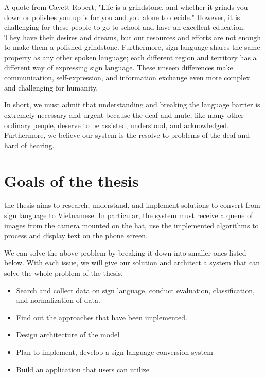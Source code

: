 A quote from Cavett Robert, "Life is a grindstone, and whether it grinds you down or polishes you up is for you and you alone to decide." However, it is challenging for these people to go to school and have an excellent education. They have their desires and dreams, but our resources and efforts are not enough to make them a polished grindstone. Furthermore, sign language shares the same property as any other spoken language; each different region and territory has a different way of expressing sign language. These unseen differences make communication, self-expression, and information exchange even more complex and challenging for humanity.

In short, we must admit that understanding and breaking the language barrier is extremely necessary and urgent because the deaf and mute, like many other ordinary people, deserve to be assisted, understood, and acknowledged. Furthermore, we believe our system is the resolve to problems of the deaf and hard of hearing.

\section{Goals of the thesis}

% 

the thesis aims to research, understand, and implement solutions to convert from sign language to Vietnamese. In particular, the system must receive a queue of images from the camera mounted on the hat, use the implemented algorithms to process and display text on the phone screen.

We can solve the above problem by breaking it down into smaller ones listed below. With each issue, we will give our solution and architect a system that can solve the whole problem of the thesis.
 
\begin{itemize}
	\item Search and collect data on sign language, conduct evaluation, classification, and normalization of data.
	\item Find out the approaches that have been implemented.
	\item Design architecture of the model
	\item Plan to implement, develop a sign language conversion system
	\item Build an application that users can utilize
\end{itemize}


